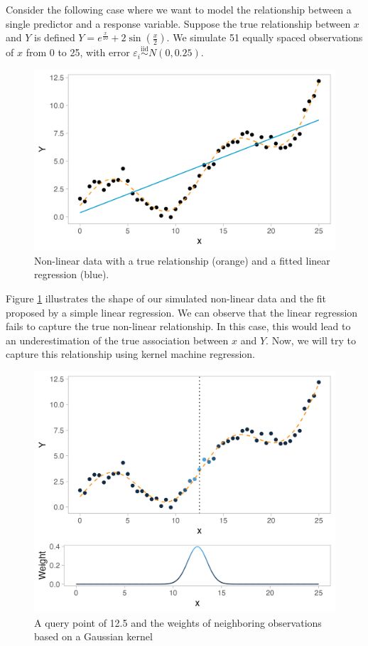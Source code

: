\documentclass[12pt, twoside]{amherstthesis}
\begin{document}
Consider the following case where we want to model the relationship between a single predictor and a response variable. Suppose the true relationship between \(x\) and \(Y\) is defined \(Y = e^{\frac{x}{10}} + 2\sin(\frac{x}{2})\). We simulate 51 equally spaced observations of \(x\) from 0 to 25, with error \(\varepsilon_i \overset{\text{iid}}\sim N(0, 0.25)\).
\begin{figure}

{\centering \includegraphics[width=0.75\linewidth]{figures/ch3_toy1} 

}

\caption{Non-linear data with a true relationship (orange) and a fitted linear regression (blue).}\label{fig:toy1}
\end{figure}
Figure \ref{fig:toy1} illustrates the shape of our simulated non-linear data and the fit proposed by a simple linear regression. We can observe that the linear regression fails to capture the true non-linear relationship. In this case, this would lead to an underestimation of the true association between \(x\) and \(Y\). Now, we will try to capture this relationship using kernel machine regression.
\begin{figure}

{\centering \includegraphics[width=0.75\linewidth]{figures/ch3_toy2} 

}

\caption{A query point of 12.5 and the weights of neighboring observations based on a Gaussian kernel}\label{fig:toy2}
\end{figure}
\end{document}

